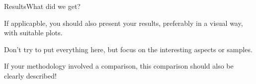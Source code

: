 \begin{frame}[t]{Results}{What did we get?}

If applicapble, you should also present your results, preferably in a visual way, with suitable plots.

Don't try to put everything here, but focus on the interesting aspects or samples.

If your methodology involved a comparison, this comparison should also be clearly described!

\end{frame}
